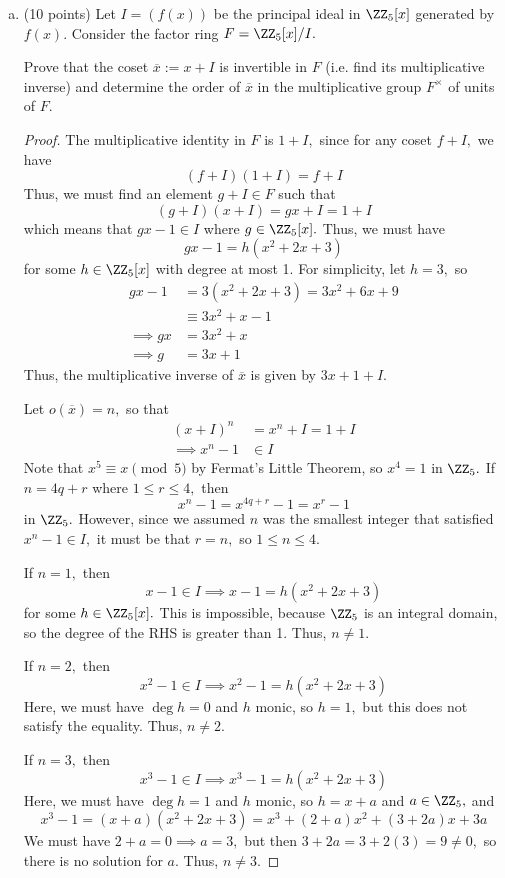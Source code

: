 \documentclass{article}
\begin{document}
\begin{itemize}
\begin{enumerate}[(a)]
			\item (10 points) Let $I=(f(x))$ be the principal ideal in $\ZZ_5[x]$ generated by $f(x).$ Consider the factor ring $F=\ZZ_5[x]/I.$

				Prove that the coset $\overline{x}:=x+I$ is invertible in $F$ (i.e. find its multiplicative inverse) and determine the order of $\overline{x}$ in the multiplicative group $F^\times$ of units of $F.$
				\begin{proof}
					The multiplicative identity in $F$ is $1+I,$ since for any coset $f+I,$ we have 
					\[(f+I)(1+I)=f+I\]
					Thus, we must find an element $g+I\in F$ such that
					\[(g+I)(x+I)=gx+I=1+I\]
					which means that $gx-1\in I$ where $g\in \ZZ_5[x].$ Thus, we must have 
					\[gx-1=h(x^2+2x+3)\]
					for some $h\in \ZZ_5[x]$ with degree at most 1. For simplicity, let $h=3,$ so
					\begin{align*}
						gx-1 &= 3(x^2+2x+3) = 3x^2+6x+9 \\
						&\equiv 3x^2+x-1 \\
						\implies gx &= 3x^2+x \\
						\implies g&= 3x+1
					\end{align*}
					Thus, the multiplicative inverse of $\overline x$ is given by $3x+1+I.$

					Let $o(\overline x)=n,$ so that
					\begin{align*}
						(x+I)^n &= x^n+I = 1+I \\
						\implies x^n-1 &\in I
					\end{align*}
					Note that $x^5\equiv x\pmod 5$ by Fermat's Little Theorem, so $x^4=1$ in $\ZZ_5.$ If $n=4q+r$ where $1\le r\le 4,$ then \[x^n-1= x^{4q+r}-1=x^r-1\] in $\ZZ_5.$ However, since we assumed $n$ was the smallest integer that satisfied $x^n-1\in I,$ it must be that $r=n,$ so $1\le n\le4.$

					If $n=1,$ then 
					\[x-1\in I\implies x-1=h(x^2+2x+3)\]
					for some $h\in \ZZ_5[x].$ This is impossible, because $\ZZ_5$ is an integral domain, so the degree of the RHS is greater than 1. Thus, $n\neq 1.$

					If $n=2,$ then
					\[x^2-1\in I\implies x^2-1=h(x^2+2x+3)\]
					Here, we must have $\deg h=0$ and $h$ monic, so $h=1,$ but this does not satisfy the equality. Thus, $n\neq 2.$

					If $n=3,$ then
					\[x^3-1\in I\implies x^3-1=h(x^2+2x+3)\]
					Here, we must have $\deg h=1$ and $h$ monic, so $h=x+a$ and $a\in\ZZ_5,$ and 
					\[x^3-1=(x+a)(x^2+2x+3)=x^3+(2+a)x^2 + (3+2a)x+3a\]
					We must have $2+a=0\implies a=3,$ but then $3+2a=3+2(3)=9\neq 0,$ so there is no solution for $a.$ Thus, $n\neq 3.$


\end{proof}
\end{enumerate}
\end{itemize}
\end{document}
